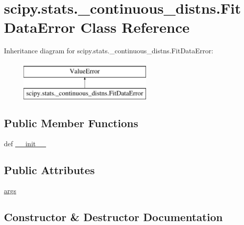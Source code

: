 \hypertarget{classscipy_1_1stats_1_1__continuous__distns_1_1FitDataError}{}\section{scipy.\+stats.\+\_\+continuous\+\_\+distns.\+Fit\+Data\+Error Class Reference}
\label{classscipy_1_1stats_1_1__continuous__distns_1_1FitDataError}
Inheritance diagram for scipy.\+stats.\+\_\+continuous\+\_\+distns.\+Fit\+Data\+Error\+:\begin{figure}[H]
\begin{center}
\leavevmode
\includegraphics[height=2.000000cm]{classscipy_1_1stats_1_1__continuous__distns_1_1FitDataError}
\end{center}
\end{figure}
\subsection*{Public Member Functions}
\begin{DoxyCompactItemize}
\item 
def \hyperlink{classscipy_1_1stats_1_1__continuous__distns_1_1FitDataError_a707378ea99a582752561698ca6779346}{\+\_\+\+\_\+init\+\_\+\+\_\+}
\end{DoxyCompactItemize}
\subsection*{Public Attributes}
\begin{DoxyCompactItemize}
\item 
\hyperlink{classscipy_1_1stats_1_1__continuous__distns_1_1FitDataError_a2fc336c085efbaf5936d26ae02175ed5}{args}
\end{DoxyCompactItemize}


\subsection{Constructor \& Destructor Documentation}
\hypertarget{classscipy_1_1stats_1_1__continuous__distns_1_1FitDataError_a707378ea99a582752561698ca6779346}{}
